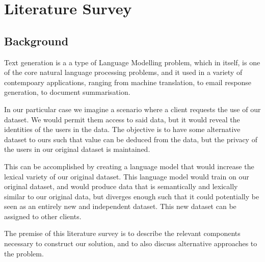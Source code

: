 \documentclass[12pt,twoside]{report}
\begin{document}
\chapter{Literature Survey}

\section{Background}






Text generation is a a type of Language Modelling problem, which in itself, is one of the core natural language processing problems, and it used in a variety of contempoary applications, ranging from machine translation, to email response generation, to document summarisation.

In our particular case we imagine a scenario where a client requests the use of our dataset. We would permit them access to said data, but it would reveal the identities of the users in the data. The objective is to have some alternative dataset to ours such that value can be deduced from the data, but the privacy of the users in our original dataset is maintained.

This can be accomplished by creating a language model that would increase the lexical variety of our original dataset. This language model would train on our original dataset, and would produce data that is semantically and lexically similar to our original data, but diverges enough such that it could potentially be seen as an entirely new and independent dataset. This new dataset can be assigned to other clients.

The premise of this literature survey is to describe the relevant components necessary to construct our solution, and to also discuss alternative approaches to the problem. 
\end{document}
